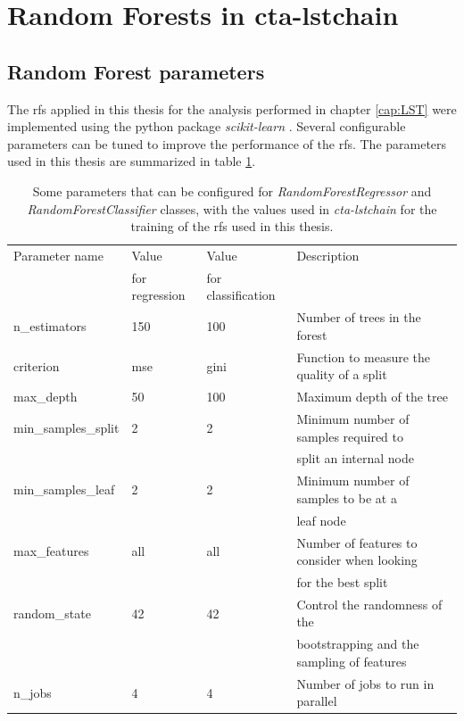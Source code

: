 \documentclass[main.tex]{subfiles}
\begin{document}
\section{Random Forests in cta-lstchain}

\subsection{Random Forest parameters}
The \glspl{rf} applied in this thesis for the analysis performed in chapter \ref{cap:LST} were implemented using the python package \textit{scikit-learn} \cite{2011scikit-learn}. Several configurable parameters can be tuned to improve the performance of the \glspl{rf}. The parameters used in this thesis are summarized in table \ref{tab:RFpars}.

\begin{table}[h!]
  \centering
  \begin{tabular}{|l|l|l|l|}
    \hline
    Parameter name & Value          & Value              & Description\\
    & for regression & for classification &  \\
    \hline
    n\_estimators       & 150 & 100  & \small{Number of trees in the forest}\\
    criterion           & mse & gini & \small{Function to measure the quality of a split}\\
    max\_depth          & 50  & 100  & \small{Maximum depth of the tree}\\
    min\_samples\_split & 2   & 2    & \small{Minimum number of samples required to}\\
    &     &      & \small{split an internal node} \\
    min\_samples\_leaf  & 2   & 2    & \small{Minimum number of samples to be at a}\\
    &     &      & \small{leaf node} \\
    max\_features       & all & all  & \small{Number of features to consider when looking} \\
    &     &      & \small{for the best split}\\
    random\_state       & 42  & 42   & \small{Control the randomness of the} \\
    &     &      & \small{bootstrapping and the sampling of features}\\
    n\_jobs             & 4   & 4    & \small{Number of jobs to run in parallel}\\
    \hline
  \end{tabular}
  \caption{Some parameters that can be configured for \textit{RandomForestRegressor} and \textit{RandomForestClassifier} classes, with the values used in \textit{cta-lstchain} for the training of the \glspl{rf} used in this thesis.}
  \label{tab:RFpars}
\end{table}
\end{document}
